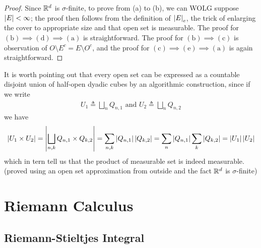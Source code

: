 \documentclass{report}
\begin{document}
\begin{proof}
Since $\mathbb{R}^d$ is  $\sigma$-finite, to prove from (a) to (b), we can WOLG suppose $\left|E\right|<\infty$; the proof then follows from the definition of $\left|E\right|_e$, the trick of enlarging the cover to appropriate size and that open set is measurable. The proof for $(\text{b})\implies (\text{d})\implies (\text{a})$ is straightforward. The proof for $(\text{b})\implies (\text{c})$ is observation of $O \setminus E^c= E\setminus O^c$, and the proof for  $(\text{c})\implies (\text{e})\implies (\text{a})$ is again straightforward.
\end{proof}
\begin{mdframed}
It is worth pointing out that every open set can be expressed as a countable disjoint union of half-open dyadic cubes by an algorithmic construction, since if we write  
\begin{align*}
U_1\triangleq \bigsqcup_n Q_{n,1}\text{ and }U_2 \triangleq \bigsqcup_n Q_{n,2}
\end{align*}
we have 
\begin{align*}
\left|U_1\times U_2\right|=\left|\bigsqcup_{n,k}Q_{n,1}\times Q_{k,2}\right|=\sum_{n,k} \left|Q_{n,1}\right| \left|Q_{k,2}\right|= \sum_n \left|Q_{n,1}\right|\sum_{k} \left|Q_{k,2}\right|= \left|U_1\right|\left|U_2\right|
\end{align*}
which in tern tell us that the product of measurable set is indeed measurable. (proved using an open set approximation from outside and the fact $\mathbb{R}^d$ is  $\sigma$-finite) \\


\end{mdframed}

\chapter{Riemann Calculus}
\section{Riemann-Stieltjes Integral}
\end{document}
